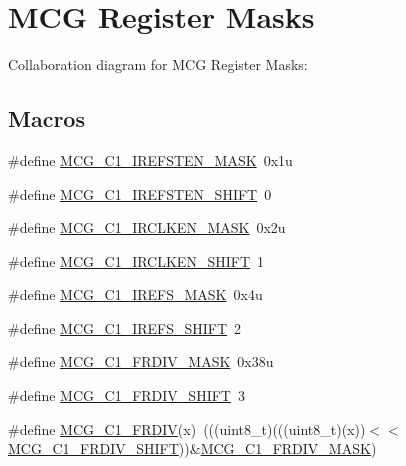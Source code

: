 \hypertarget{group___m_c_g___register___masks}{}\section{M\+CG Register Masks}
\label{group___m_c_g___register___masks}
Collaboration diagram for M\+CG Register Masks\+:
\subsection*{Macros}
\begin{DoxyCompactItemize}
\item 
\#define \hyperlink{group___m_c_g___register___masks_ga275f9145f8c55ff4c836cbd20ab06139}{M\+C\+G\+\_\+\+C1\+\_\+\+I\+R\+E\+F\+S\+T\+E\+N\+\_\+\+M\+A\+SK}~0x1u
\item 
\#define \hyperlink{group___m_c_g___register___masks_ga10e0a80bfe715350aba6d5f5212617bc}{M\+C\+G\+\_\+\+C1\+\_\+\+I\+R\+E\+F\+S\+T\+E\+N\+\_\+\+S\+H\+I\+FT}~0
\item 
\#define \hyperlink{group___m_c_g___register___masks_ga50398d9dc80a3016fddc6a2aef3df994}{M\+C\+G\+\_\+\+C1\+\_\+\+I\+R\+C\+L\+K\+E\+N\+\_\+\+M\+A\+SK}~0x2u
\item 
\#define \hyperlink{group___m_c_g___register___masks_ga2c4305645e7c2b3977dcd0d35c7eaab9}{M\+C\+G\+\_\+\+C1\+\_\+\+I\+R\+C\+L\+K\+E\+N\+\_\+\+S\+H\+I\+FT}~1
\item 
\#define \hyperlink{group___m_c_g___register___masks_gadc14970d17e8ee736a16805a412a87fe}{M\+C\+G\+\_\+\+C1\+\_\+\+I\+R\+E\+F\+S\+\_\+\+M\+A\+SK}~0x4u
\item 
\#define \hyperlink{group___m_c_g___register___masks_gada376a938782b95d20788418a2564476}{M\+C\+G\+\_\+\+C1\+\_\+\+I\+R\+E\+F\+S\+\_\+\+S\+H\+I\+FT}~2
\item 
\#define \hyperlink{group___m_c_g___register___masks_gac7762b84f41121882f4d1fbcaa839aeb}{M\+C\+G\+\_\+\+C1\+\_\+\+F\+R\+D\+I\+V\+\_\+\+M\+A\+SK}~0x38u
\item 
\#define \hyperlink{group___m_c_g___register___masks_gaee124d0ce81f6e815dbbcac62440708b}{M\+C\+G\+\_\+\+C1\+\_\+\+F\+R\+D\+I\+V\+\_\+\+S\+H\+I\+FT}~3
\item 
\#define \hyperlink{group___m_c_g___register___masks_ga39519f6e6a3b433988eca107d0e7d460}{M\+C\+G\+\_\+\+C1\+\_\+\+F\+R\+D\+IV}(x)~(((uint8\+\_\+t)(((uint8\+\_\+t)(x))$<$$<$\hyperlink{group___m_c_g___register___masks_gaee124d0ce81f6e815dbbcac62440708b}{M\+C\+G\+\_\+\+C1\+\_\+\+F\+R\+D\+I\+V\+\_\+\+S\+H\+I\+FT}))\&\hyperlink{group___m_c_g___register___masks_gac7762b84f41121882f4d1fbcaa839aeb}{M\+C\+G\+\_\+\+C1\+\_\+\+F\+R\+D\+I\+V\+\_\+\+M\+A\+SK})
$$
\end{DoxyCompactItemize}

